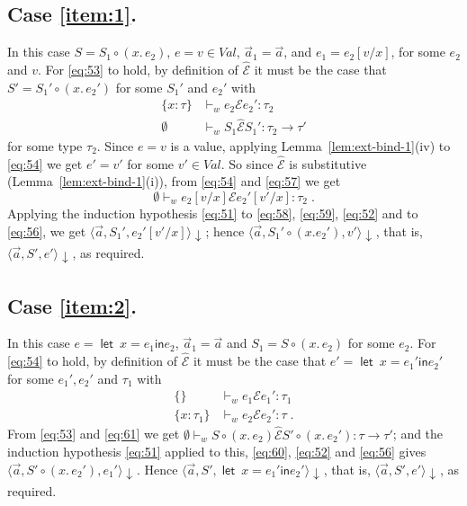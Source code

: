 \documentclass{LMCS}
\theoremstyle{plain}
\theoremstyle{definition}
\newcommand{\comp}{\circ}
\newcommand{\config}[3]{\langle#1, #2, #3\rangle}
\newcommand{\CR}[1]{\mathrel{\widehat{#1}}}
\newcommand{\ent}{\vdash}
\newcommand{\EQ}{\mathbin{\kw{=}}}
\newcommand{\er}{\mathrel{\mathcal{E}}}
\renewcommand{\exp}[1][e]{#1}
\newcommand{\FUNTY}{\mathbin{\rightarrow}}
\newcommand{\IN}{\mathrel{\kw{in}}}
\newcommand{\LET}{\mathop{\kw{let}}}
\newcommand{\kw}[1]{\mathsf{#1}}
\newcommand{\ofty}{:}
\newcommand{\s}[1][a]{\vec{#1}}
\newcommand{\stk}[1][S]{#1}
\newcommand{\sub}[2]{{[#2/#1]}}
\newcommand{\terminates}[1][]{{\downarrow_{#1}}}
\newcommand{\ty}{\tau}
\newcommand{\val}[1][v]{#1}
\newcommand{\Val}{\mathit{Val}}
\newcommand{\vid}[1][x]{#1}
\newcommand{\w}[1][w]{#1}
\begin{document}
  \subsection*{Case \ref{item:1}.} In this case
  $\stk=\stk_1\comp(\vid.\,\exp_2)$, $\exp=\val\in\Val$, $\s_1=\s$, and
  $\exp_1=\exp_2\sub{\vid}{\val}$, for some $\exp_2$ and $\val$. For
  \eqref{eq:53} to hold, by definition of $\CR{\er}$ it must be the
  case that $\stk'=\stk_1'\comp(\vid.\,\exp_2')$ for some $\stk_1'$ and
  $\exp_2'$ with
  \begin{align}
    \{\vid\ofty\ty\} &\ent_{\w} \exp_2\er
    \exp_2'\ofty\ty_2 \label{eq:57}\\
    \emptyset &\ent_{\w}
    \stk_1\CR{\er}\stk_1'\ofty\ty_2\FUNTY\ty'\label{eq:58}
  \end{align}
  for some type $\ty_2$. Since $\exp=\val$ is a value, applying
  Lemma~\ref{lem:ext-bind-1}(iv) to \eqref{eq:54} we get
  $\exp'=\val'$ for some $\val'\in\Val$. So since $\CR{\er}$ is
  substitutive (Lemma~\ref{lem:ext-bind-1}(i)), from \eqref{eq:54} and
  \eqref{eq:57} we get
  \begin{equation}
    \label{eq:59}
    \emptyset\ent_{\w} \exp_2\sub{\vid}{\val} \er  
    \exp_2'\sub{\vid}{\val'}\ofty \ty_2\;.
  \end{equation}
  Applying the induction hypothesis \eqref{eq:51} to \eqref{eq:58},
  \eqref{eq:59}, \eqref{eq:52} and to \eqref{eq:56}, we get
  $\config{\s}{\stk_1'}{\exp_2'\sub{\vid}{\val'}}\terminates$; hence
  $\config{\s}{\stk_1'\comp(\vid.\exp_2')}{\val'}\terminates$,
  that is, $\config{\s}{\stk'}{\exp'}\terminates$, as required.

  \subsection*{Case \ref{item:2}.} In this case $\exp = \LET\ {\vid\EQ
    \exp_1} \IN \exp_2$, $\s_1=\s$ and
  $\stk_1=\stk\comp(\vid.\,\exp_2)$ for some $\exp_2$.  For
  \eqref{eq:54} to hold, by definition of $\CR{\er}$ it must be the
  case that $\exp'=\LET\ {\vid\EQ\exp_1'} \IN \exp_2'$ for some
  $\exp_1',\exp_2'$ and $\ty_1$ with
  \begin{align}
    \{\} &\ent_{\w} \exp_1\er \exp_1'\ofty \ty_1\label{eq:60}\\
    \{x\ofty\ty_1\} &\ent_{\w} \exp_2 \er \exp_2'\ofty \ty\;.
    \label{eq:61}
  \end{align}
  From \eqref{eq:53} and \eqref{eq:61} we get $\emptyset\ent_{\w}
  \stk\comp(\vid.\,\exp_2) \CR{\er} \stk'\comp(\vid.\,\exp_2')\ofty
  \ty\FUNTY \ty'$; and the induction hypothesis \eqref{eq:51} applied
  to this, \eqref{eq:60}, \eqref{eq:52} and \eqref{eq:56} gives
  $\config{\s}{\stk'\comp(\vid.\,\exp_2')}{\exp_1'}\terminates$. Hence
  $\config{\s}{\stk'}{\LET\ {\vid\EQ\exp_1'} \IN \exp_2'}\terminates$,
  that is, $\config{\s}{\stk'}{\exp'}\terminates$, as required.
\end{document}
